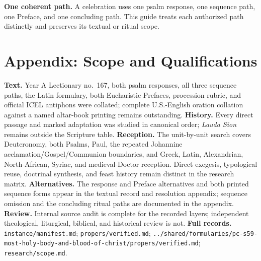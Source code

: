 \begin{deepstudy}
\vspace{-0.5\baselineskip}
\begin{studyframe}
\textbf{One coherent path.} A celebration uses one psalm response, one sequence path, one Preface, and one concluding path. This guide treats each authorized path distinctly and preserves its textual or ritual scope.
\end{studyframe}

\clearpage

\section*{Appendix: Scope and Qualifications}

\begin{studyframe}
\textbf{Text.} Year A Lectionary no.~167, both psalm responses, all three sequence paths, the Latin formulary, both Eucharistic Prefaces, procession rubric, and official ICEL antiphons were collated; complete U.S.-English oration collation against a named altar-book printing remains outstanding. \textbf{History.} Every direct passage and marked adaptation was studied in canonical order; \emph{Lauda Sion} remains outside the Scripture table. \textbf{Reception.} The unit-by-unit search covers Deuteronomy, both Psalms, Paul, the repeated Johannine acclamation/Gospel/Communion boundaries, and Greek, Latin, Alexandrian, North-African, Syriac, and medieval-Doctor reception. Direct exegesis, typological reuse, doctrinal synthesis, and feast history remain distinct in the research matrix. \textbf{Alternatives.} The response and Preface alternatives and both printed sequence forms appear in the textual record and resolution appendix; sequence omission and the concluding ritual paths are documented in the appendix. \textbf{Review.} Internal source audit is complete for the recorded layers; independent theological, liturgical, biblical, and historical review is not. \textbf{Full records.} \nolinkurl{instance/manifest.md}; \nolinkurl{propers/verified.md}; \nolinkurl{../shared/formularies/pc-s59-most-holy-body-and-blood-of-christ/propers/verified.md}; \nolinkurl{research/scope.md}.
\end{studyframe}


\end{deepstudy}
